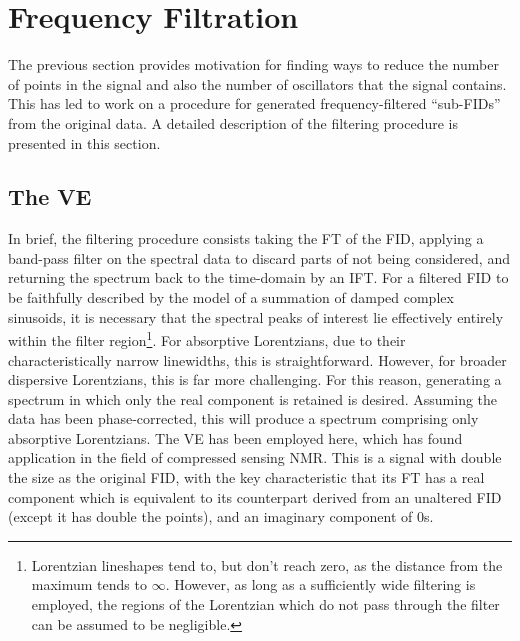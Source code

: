 \section{Frequency Filtration}
\label{sec:filtering}
The previous section provides motivation for finding ways to reduce the
number of points in the signal and also the number of oscillators that the
signal contains. This has led to work on a procedure for generated
frequency-filtered ``sub-FIDs'' from the original data. A detailed description
of the filtering procedure is presented in this section.

\subsection{The \acl{VE}}
In brief, the filtering procedure  consists taking the \ac{FT} of the \ac{FID},
applying a band-pass filter on the spectral data to discard parts of not being
considered, and returning the spectrum back to the time-domain by an \ac{IFT}.
For a filtered \ac{FID} to be faithfully described by the model of a
summation of damped complex sinusoids, it is necessary that the
spectral peaks of interest lie effectively entirely within the filter
region\footnote{
    Lorentzian lineshapes tend to, but don't reach zero, as the distance from
    the maximum tends to $\infty$\cite{Tang1994}. However, as long as a
    sufficiently wide filtering is employed, the regions of the Lorentzian
    which do not pass through the filter can be assumed to be negligible.
}.
For absorptive Lorentzians, due to their characteristically narrow
linewidths, this is straightforward. However, for broader dispersive
Lorentzians, this is far more challenging. For this reason, generating
a spectrum in which only the real component is retained is desired.
Assuming the data has been phase-corrected, this will produce a
spectrum comprising only absorptive Lorentzians. The \ac{VE} has been employed
here, which has found application in the field of compressed sensing
NMR\cite{Mayzel2014,Golowicz2020,Luo2020}. This is a signal with double the
size as the original \ac{FID}, with the key characteristic that its \ac{FT} has
a real component which is equivalent to its counterpart derived from an
unaltered \ac{FID} (except it has double the points), and an imaginary
component of $0$s.


